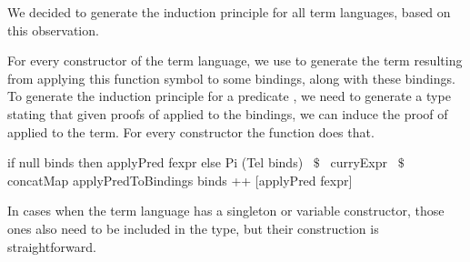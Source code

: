 We decided to generate the induction principle for all term languages, based on this observation. 

For every constructor of the term language, we use  to generate the term resulting from applying this function symbol to some bindings, along with these bindings. To generate the induction principle for a predicate , we need to generate a type stating that given proofs of  applied to the bindings, we can induce the proof of  applied to the term. For every constructor the function  does that. 
\begin{hscode} 
 if null binds then applyPred fexpr
 else Pi (Tel binds) ~$\$$~
         curryExpr ~$\$$~ concatMap applyPredToBindings binds 
                     ++ [applyPred fexpr]
\end{hscode}
In cases when the term language has a singleton or variable constructor, those ones also need to be included in the type, but their construction is straightforward.  

